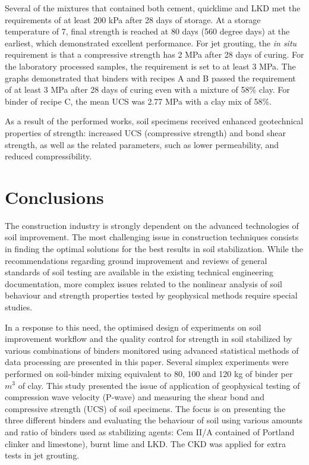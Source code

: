 \documentclass[USenglish,twocolumn]{article}
\begin{document}
Several of the mixtures that contained both cement, quicklime and LKD met the requirements of at least 200 kPa after 28 days of storage. At a storage temperature of 7\degree, final strength is reached at 80 days (560 degree days) at the earliest, which demonstrated excellent performance. For jet grouting, the \emph{in situ} requirement is that a compressive strength has 2 MPa after 28 days of curing. For the laboratory processed samples, the requirement is set to at least 3 MPa. The graphs demonstrated that binders with recipes A and B passed the requirement of at least 3 MPa after 28 days of curing even with a mixture of 58\% clay. For binder of recipe C, the mean UCS was 2.77 MPa with a clay mix of 58\%. 

As a result of the performed works, soil specimens received enhanced geotechnical properties of strength: increased UCS (compressive strength) and bond shear strength, as well as the related parameters, such as lower permeability, and reduced compressibility. 

\section{Conclusions}

The construction industry is strongly dependent on the advanced technologies of soil improvement. The most challenging issue in construction techniques consists in finding the optimal solutions for the best results in soil stabilization. While the recommendations regarding ground improvement and reviews of general standards of soil testing are available in the existing technical engineering documentation, more complex issues related to the nonlinear analysis of soil behaviour and strength properties tested by geophysical methods require special studies. 

In a response to this need, the optimised design of experiments on soil improvement workflow and the quality control for strength in soil stabilized by various combinations of binders monitored using advanced statistical methods of data processing are presented in this paper. Several simplex experiments were performed on soil-binder mixing equivalent to 80, 100 and 120 kg of binder per $m^3$ of clay. This study presented the issue of application of geophysical testing of compression wave velocity (P-wave) and measuring the shear bond and compressive strength (UCS) of soil specimens. The focus is on presenting the three different binders and evaluating the behaviour of soil using various amounts and ratio of binders used as stabilizing agents: Cem II/A contained of Portland clinker and limestone), burnt lime and LKD. The CKD was applied for extra tests in jet grouting.
\end{document}
